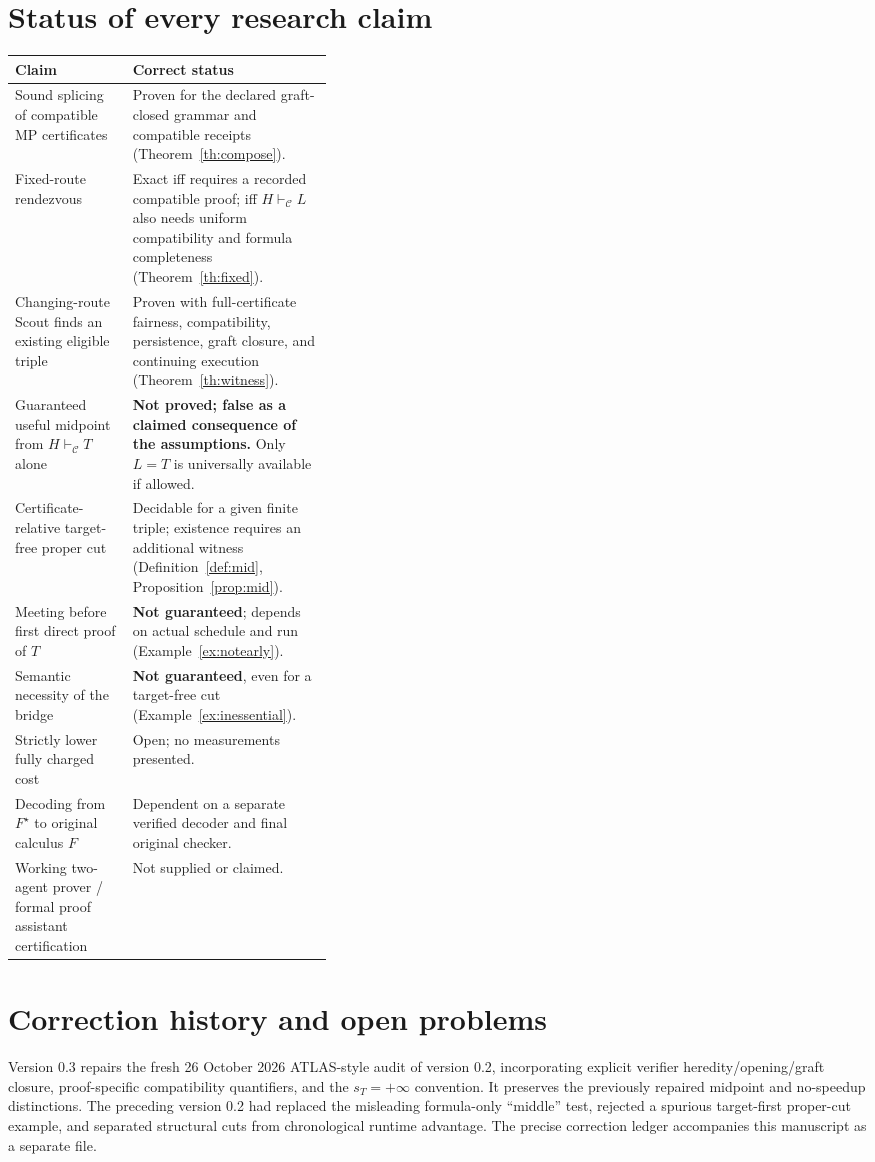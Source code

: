 \documentclass[11pt,letterpaper]{article}
\theoremstyle{definition}
\newcommand{\vdC}{\vdash_{\mathcal C}}
\begin{document}
\section{Status of every research claim}
\small
\begin{tabularx}{\linewidth}{@{}>{\raggedright\arraybackslash}p{0.37\linewidth}X@{}}
\toprule
\textbf{Claim} & \textbf{Correct status}\\\midrule
Sound splicing of compatible MP certificates & Proven for the declared graft-closed grammar and compatible receipts (Theorem~\ref{th:compose}).\\
Fixed-route rendezvous & Exact iff requires a recorded compatible proof; iff $H\vdC L$ also needs uniform compatibility and formula completeness (Theorem~\ref{th:fixed}).\\
Changing-route Scout finds an existing eligible triple & Proven with full-certificate fairness, compatibility, persistence, graft closure, and continuing execution (Theorem~\ref{th:witness}).\\
Guaranteed useful midpoint from $H\vdC T$ alone & \textbf{Not proved; false as a claimed consequence of the assumptions.} Only $L=T$ is universally available if allowed.\\
Certificate-relative target-free proper cut & Decidable for a given finite triple; existence requires an additional witness (Definition~\ref{def:mid}, Proposition~\ref{prop:mid}).\\
Meeting before first direct proof of $T$ & \textbf{Not guaranteed}; depends on actual schedule and run (Example~\ref{ex:notearly}).\\
Semantic necessity of the bridge & \textbf{Not guaranteed}, even for a target-free cut (Example~\ref{ex:inessential}).\\
Strictly lower fully charged cost & Open; no measurements presented.\\
Decoding from $F^\star$ to original calculus $F$ & Dependent on a separate verified decoder and final original checker.\\
Working two-agent prover / formal proof assistant certification & Not supplied or claimed.\\
\bottomrule
\end{tabularx}
\normalsize

\section{Correction history and open problems}
Version 0.3 repairs the fresh 26 October 2026 ATLAS-style audit of
version 0.2, incorporating explicit verifier heredity/opening/graft
closure, proof-specific compatibility quantifiers, and the $s_T=+\infty$
convention. It preserves the previously repaired midpoint and
no-speedup distinctions. The preceding version 0.2
had replaced the misleading formula-only ``middle'' test, rejected a
spurious target-first proper-cut example, and separated structural cuts
from chronological runtime advantage. The precise
correction ledger accompanies this manuscript as a separate file.
\end{document}
